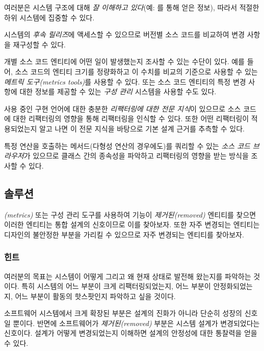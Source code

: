 \documentclass[a4paper,10pt,twoside]{book}
\begin{document}
\begin{bulletlist}
\item 여러분은 시스템 구조에 대해 \emph{잘 이해하고 있다}(예: 를 통해 얻은 정보), 따라서 적절한 하위 시스템에 집중할 수 있다.

\item 시스템의 \emph{후속 릴리즈}에 액세스할 수 있으므로 버전별 소스 코드를 비교하여 변경 사항을 재구성할 수 있다.

\item 개별 소스 코드 엔티티에 어떤 일이 발생했는지 조사할 수 있는 수단이 있다. 예를 들어, 소스 코드의 엔티티 크기를 정량화하고 이 수치를 비교의 기준으로 사용할 수 있는 \emph{메트릭 도구(metrics tools)}를 사용할 수 있다. 또는 소스 코드 엔티티의 특정 변경 사항에 대한 정보를 제공할 수 있는 \emph{구성 관리} 시스템을 사용할 수도 있다.

\item 사용 중인 구현 언어에 대한 충분한 \emph{리팩터링에 대한 전문 지식}이 있으므로 소스 코드에 대한 리팩터링의 영향을 통해 리팩터링을 인식할 수 있다. 또한 어떤 리팩터링이 적용되었는지 알고 나면 이 전문 지식을 바탕으로 기본 설계 근거를 추측할 수 있다.

\item 특정 연산을 호출하는 메서드(다형성 연산의 경우에도)를 쿼리할 수 있는 \emph{소스 코드 브라우저}가 있으므로 클래스 간의 종속성을 파악하고 리팩터링의 영향을 받는 방식을 조사할 수 있다.
\end{bulletlist}

\subsection*{솔루션}

\emph{(metrics)} 또는 구성 관리 도구를 사용하여 기능이 \emph{제거된(removed)} 엔티티를 찾으면 이러한 엔티티는 통합 설계의 신호이므로 이를 찾아보자. 또한 자주 변경되는 엔티티는 디자인의 불안정한 부분을 가리킬 수 있으므로 자주 변경되는 엔티티를 찾아보자.

\subsubsection*{힌트}

여러분의 목표는 시스템이 어떻게 그리고 왜 현재 상태로 발전해 왔는지를 파악하는 것이다. 특히 시스템의 어느 부분이 크게 리팩터링되었는지, 어느 부분이 안정화되었는지, 어느 부분이 활동의 핫스팟인지 파악하고 싶을 것이다.

소프트웨어 시스템에서 크게 확장된 부분은 설계의 진화가 아니라 단순히 성장의 신호일 뿐이다. 반면에 소프트웨어가 \emph{제거된(removed)} 부분은 시스템 설계가 변경되었다는 신호이다. 설계가 어떻게 변경되었는지 이해하면 설계의 안정성에 대한 통찰력을 얻을 수 있다.
\end{document}
